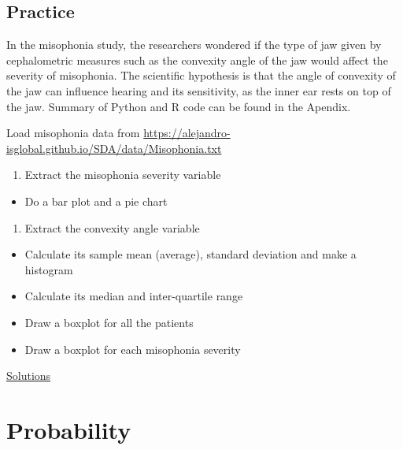 \documentclass[
]{book}
\providecommand{\tightlist}{%
  \setlength{\itemsep}{0pt}\setlength{\parskip}{0pt}}
\begin{document}
\hypertarget{practice}{%
\section{Practice}\label{practice}}

In the misophonia study, the researchers wondered if the type of jaw given by cephalometric measures such as the convexity angle of the jaw would affect the severity of misophonia. The scientific hypothesis is that the angle of convexity of the jaw can influence hearing and its sensitivity, as the inner ear rests on top of the jaw. Summary of Python and R code can be found in the Apendix.

Load misophonia data from \url{https://alejandro-isglobal.github.io/SDA/data/Misophonia.txt}

\begin{enumerate}
\def\labelenumi{\arabic{enumi}.}
\tightlist
\item
  Extract the misophonia severity variable
\end{enumerate}

\begin{itemize}
\tightlist
\item
  Do a bar plot and a pie chart
\end{itemize}

\begin{enumerate}
\def\labelenumi{\arabic{enumi}.}
\setcounter{enumi}{1}
\tightlist
\item
  Extract the convexity angle variable
\end{enumerate}

\begin{itemize}
\tightlist
\item
  Calculate its sample mean (average), standard deviation and make a histogram
\item
  Calculate its median and inter-quartile range
\item
  Draw a boxplot for all the patients
\item
  Draw a boxplot for each misophonia severity
\end{itemize}

\href{https://colab.research.google.com/drive/1ncTaoBgskCJcBIb0-PdnbUFr_AKU0XRF?usp=sharing}{Solutions}

\hypertarget{probability}{%
\chapter{Probability}\label{probability}}
\end{document}
